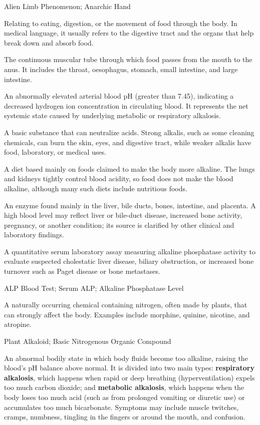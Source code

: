 \synonyms
Alien Limb Phenomenon; Anarchic Hand

 Relating to eating, digestion, or the movement of food through the body. In medical language, it usually refers to the digestive tract and the organs that help break down and absorb food.

 The continuous muscular tube through which food passes from the mouth to the anus. It includes the throat, oesophagus, stomach, small intestine, and large intestine.

 An abnormally elevated arterial blood pH (greater than 7.45), indicating a decreased hydrogen ion concentration in circulating blood. It represents the net systemic state caused by underlying metabolic or respiratory alkalosis.

 A basic substance that can neutralize acids. Strong alkalis, such as some cleaning chemicals, can burn the skin, eyes, and digestive tract, while weaker alkalis have food, laboratory, or medical uses.

 A diet based mainly on foods claimed to make the body more alkaline. The lungs and kidneys tightly control blood acidity, so food does not make the blood alkaline, although many such diets include nutritious foods.

 An enzyme found mainly in the liver, bile ducts, bones, intestine, and placenta. A high blood level may reflect liver or bile-duct disease, increased bone activity, pregnancy, or another condition; its source is clarified by other clinical and laboratory findings.

 A quantitative serum laboratory assay measuring alkaline phosphatase activity to evaluate suspected cholestatic liver disease, biliary obstruction, or increased bone turnover such as Paget disease or bone metastases.

\synonyms
ALP Blood Test; Serum ALP; Alkaline Phosphatase Level

 A naturally occurring chemical containing nitrogen, often made by plants, that can strongly affect the body. Examples include morphine, quinine, nicotine, and atropine.

\synonyms
Plant Alkaloid; Basic Nitrogenous Organic Compound

 An abnormal bodily state in which body fluids become too alkaline, raising the blood's pH balance above normal. It is divided into two main types: \textbf{respiratory alkalosis}, which happens when rapid or deep breathing (hyperventilation) expels too much carbon dioxide; and \textbf{metabolic alkalosis}, which happens when the body loses too much acid (such as from prolonged vomiting or diuretic use) or accumulates too much bicarbonate. Symptoms may include muscle twitches, cramps, numbness, tingling in the fingers or around the mouth, and confusion.

